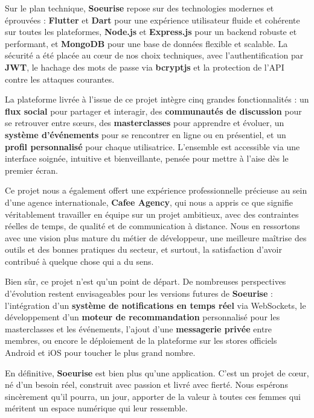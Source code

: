 \documentclass[12pt,a4paper]{report}
\begin{document}
	\medskip
	
	Sur le plan technique, \textbf{Soeurise} repose sur des technologies 
	modernes et éprouvées : \textbf{Flutter} et \textbf{Dart} pour une 
	expérience utilisateur fluide et cohérente sur toutes les plateformes, 
	\textbf{Node.js} et \textbf{Express.js} pour un backend robuste et 
	performant, et \textbf{MongoDB} pour une base de données flexible et 
	scalable. La sécurité a été placée au cœur de nos choix techniques, 
	avec l'authentification par \textbf{JWT}, le hachage des mots de passe 
	via \textbf{bcryptjs} et la protection de l'API contre les attaques 
	courantes.
	
	\medskip
	
	La plateforme livrée à l'issue de ce projet intègre cinq grandes 
	fonctionnalités : un \textbf{flux social} pour partager et interagir, 
	des \textbf{communautés de discussion} pour se retrouver entre sœurs, 
	des \textbf{masterclasses} pour apprendre et évoluer, un \textbf{système 
		d'événements} pour se rencontrer en ligne ou en présentiel, et un 
	\textbf{profil personnalisé} pour chaque utilisatrice. L'ensemble est 
	accessible via une interface soignée, intuitive et bienveillante, pensée 
	pour mettre à l'aise dès le premier écran.
	
	\medskip
	
	Ce projet nous a également offert une expérience professionnelle précieuse 
	au sein d'une agence internationale, \textbf{Cafee Agency}, qui nous a 
	appris ce que signifie véritablement travailler en équipe sur un projet 
	ambitieux, avec des contraintes réelles de temps, de qualité et de 
	communication à distance. Nous en ressortons avec une vision plus mature 
	du métier de développeur, une meilleure maîtrise des outils et des 
	bonnes pratiques du secteur, et surtout, la satisfaction d'avoir contribué 
	à quelque chose qui a du sens.
	
	\medskip
	
	Bien sûr, ce projet n'est qu'un point de départ. De nombreuses 
	perspectives d'évolution restent envisageables pour les versions 
	futures de \textbf{Soeurise} : l'intégration d'un \textbf{système de 
		notifications en temps réel} via WebSockets, le développement d'un 
	\textbf{moteur de recommandation} personnalisé pour les masterclasses 
	et les événements, l'ajout d'une \textbf{messagerie privée} entre 
	membres, ou encore le déploiement de la plateforme sur les stores 
	officiels Android et iOS pour toucher le plus grand nombre.
	
	\medskip
	
	En définitive, \textbf{Soeurise} est bien plus qu'une application. 
	C'est un projet de cœur, né d'un besoin réel, construit avec passion 
	et livré avec fierté. Nous espérons sincèrement qu'il pourra, un jour, 
	apporter de la valeur à toutes ces femmes qui méritent un espace 
	numérique qui leur ressemble.
	
\end{document}
